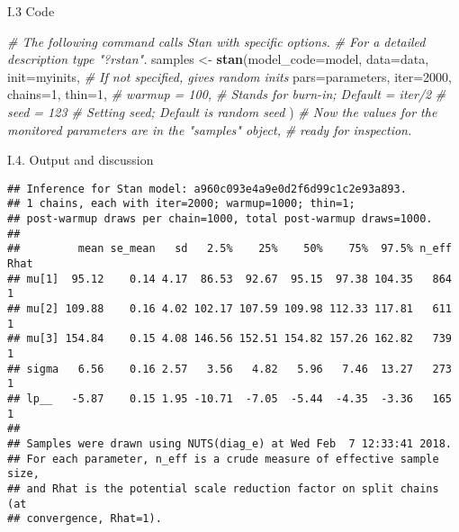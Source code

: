 \documentclass[ignorenonframetext,]{beamer}
\newenvironment{Shaded}{\begin{snugshade}}{\end{snugshade}}
\newcommand{\CommentTok}[1]{\textcolor[rgb]{0.56,0.35,0.01}{\textit{#1}}}
\newcommand{\DataTypeTok}[1]{\textcolor[rgb]{0.13,0.29,0.53}{#1}}
\newcommand{\DecValTok}[1]{\textcolor[rgb]{0.00,0.00,0.81}{#1}}
\newcommand{\KeywordTok}[1]{\textcolor[rgb]{0.13,0.29,0.53}{\textbf{#1}}}
\newcommand{\NormalTok}[1]{#1}
\newcommand{\StringTok}[1]{\textcolor[rgb]{0.31,0.60,0.02}{#1}}
\begin{document}
\begin{frame}[fragile]{%
\protect\hypertarget{i.3-code-1}{%
I.3 Code}}

\begin{Shaded}
\begin{Highlighting}[]
\CommentTok{# The following command calls Stan with specific options.}
\CommentTok{# For a detailed description type "?rstan".}
\NormalTok{samples <-}\StringTok{ }\KeywordTok{stan}\NormalTok{(}\DataTypeTok{model_code=}\NormalTok{model,   }
                \DataTypeTok{data=}\NormalTok{data, }
                \DataTypeTok{init=}\NormalTok{myinits,  }\CommentTok{# If not specified, gives random inits}
                \DataTypeTok{pars=}\NormalTok{parameters,}
                \DataTypeTok{iter=}\DecValTok{2000}\NormalTok{, }
                \DataTypeTok{chains=}\DecValTok{1}\NormalTok{, }
                \DataTypeTok{thin=}\DecValTok{1}\NormalTok{,}
                \CommentTok{# warmup = 100,  # Stands for burn-in; Default = iter/2}
                \CommentTok{# seed = 123  # Setting seed; Default is random seed}
\NormalTok{                )}
\CommentTok{# Now the values for the monitored parameters are in the "samples" object, }
\CommentTok{# ready for inspection.}
\end{Highlighting}
\end{Shaded}

\end{frame}

\begin{frame}[fragile]{%
\protect\hypertarget{i.4.-output-and-discussion}{%
I.4. Output and discussion}}

\begin{verbatim}
## Inference for Stan model: a960c093e4a9e0d2f6d99c1c2e93a893.
## 1 chains, each with iter=2000; warmup=1000; thin=1; 
## post-warmup draws per chain=1000, total post-warmup draws=1000.
## 
##         mean se_mean   sd   2.5%    25%    50%    75%  97.5% n_eff Rhat
## mu[1]  95.12    0.14 4.17  86.53  92.67  95.15  97.38 104.35   864    1
## mu[2] 109.88    0.16 4.02 102.17 107.59 109.98 112.33 117.81   611    1
## mu[3] 154.84    0.15 4.08 146.56 152.51 154.82 157.26 162.82   739    1
## sigma   6.56    0.16 2.57   3.56   4.82   5.96   7.46  13.27   273    1
## lp__   -5.87    0.15 1.95 -10.71  -7.05  -5.44  -4.35  -3.36   165    1
## 
## Samples were drawn using NUTS(diag_e) at Wed Feb  7 12:33:41 2018.
## For each parameter, n_eff is a crude measure of effective sample size,
## and Rhat is the potential scale reduction factor on split chains (at 
## convergence, Rhat=1).
\end{verbatim}

\end{frame}
\end{document}

